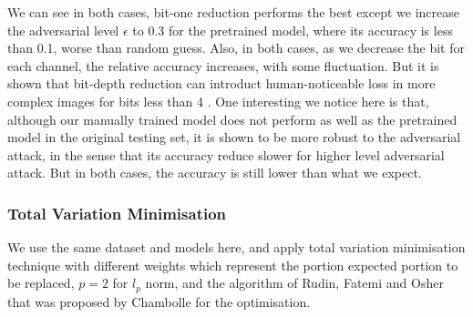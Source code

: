We can see in both cases, bit-one reduction performs the best except we increase the adversarial level $\epsilon$ to 0.3 for the pretrained model, where its accuracy is less than 0.1, worse than random guess. Also, in both cases, as we decrease the bit for each channel, the relative accuracy increases, with some fluctuation. But it is shown that bit-depth reduction can introduct human-noticeable loss in more complex images for bits less than 4 \cite{DBLP:journals/corr/XuEQ17}. One interesting we notice here is that, although our manually trained model does not perform as well as the pretrained model in the original testing set, it is shown to be more robust to the adversarial attack, in the sense that its accuracy reduce slower for higher level adversarial attack. But in both cases, the accuracy is still lower than what we expect.  


\subsubsection{Total Variation Minimisation} 
We use the same dataset and models here, and apply total variation minimisation technique with different weights which represent the portion expected portion to be replaced, $p = 2$ for $l_p$ norm, and the algorithm of Rudin, Fatemi and Osher that was proposed by Chambolle \cite{Chambolle:2004:ATV:964969.964985} for the optimisation. 

